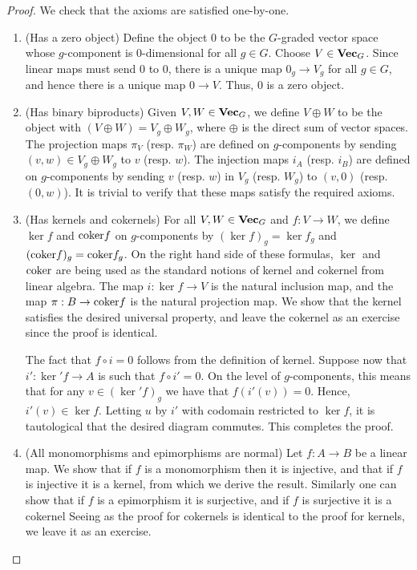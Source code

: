 \documentclass{article}
\theoremstyle{definition}
\numberwithin{figure}{section}
\begin{document}
\begin{proof} We check that the axioms are satisfied one-by-one.

\begin{enumerate}

\item (Has a zero object) Define the object $0$ to be the $G$-graded vector space whose $g$-component is $0$-dimensional for all $g\in G$. Choose $V\in \bold{Vec}_G$. Since linear maps must send $0$ to $0$, there is a unique map $0_g\to V_g$ for all $g\in G$, and hence there is a unique map $0\to V$. Thus, $0$ is a zero object.

\item (Has binary biproducts) Given $V,W\in \bold{Vec}_G$, we define $V\oplus W$ to be the object with $(V\oplus W)=V_g\oplus W_g$, where $\oplus$ is the direct sum of vector spaces. The projection maps $\pi_V$ (resp. $\pi_W$) are defined on $g$-components by sending $(v,w)\in V_g\oplus W_g$ to $v$ (resp. $w$). The injection maps $i_A$ (resp. $i_B$) are defined on $g$-components by sending $v$ (resp. $w$) in $V_g$ (resp. $W_g$) to $(v,0)$ (resp. $(0,w)$). It is trivial to verify that these maps satisfy the required axioms.

\item (Has kernels and cokernels) For all $V,W\in \bold{Vec}_G$ and $f:V\to W$, we define $\ker f$ and $\mathrm{coker} f$ on $g$-components by $(\ker f)_g=\ker f_g$ and $(\mathrm{coker} f)_g=\mathrm{coker} f_g$. On the right hand side of these formulas, $\ker$ and $\mathrm{coker}$ are being used as the standard notions of kernel and cokernel from linear algebra. The map $i: \ker f\to V$ is the natural inclusion map, and the map $\pi:B\to \mathrm{coker} f$ is the natural projection map. We show that the kernel satisfies the desired universal property, and leave the cokernel as an exercise since the proof is identical.

The fact that $f\circ i=0$ follows from the definition of kernel. Suppose now that $i':\ker' f\to A$ is such that $f\circ i'=0$. On the level of $g$-components, this means that for any $v\in (\ker' f)_g$ we have that $f(i'(v))=0$. Hence, $i'(v)\in \ker f$. Letting $u$ by $i'$ with codomain restricted to $\ker f$, it is tautological that the desired diagram commutes. This completes the proof.

\item (All monomorphisms and epimorphisms are normal) Let $f:A\to B$ be a linear map. We show that if $f$ is a monomorphism then it is injective, and that if $f$ is injective it is a kernel, from which we derive the result. Similarly one can show that if $f$ is a epimorphism it is surjective, and if $f$ is surjective it is a cokernel Seeing as the proof for cokernels is identical to the proof for kernels, we leave it as an exercise.


\end{enumerate}
\end{proof}
\end{document}
